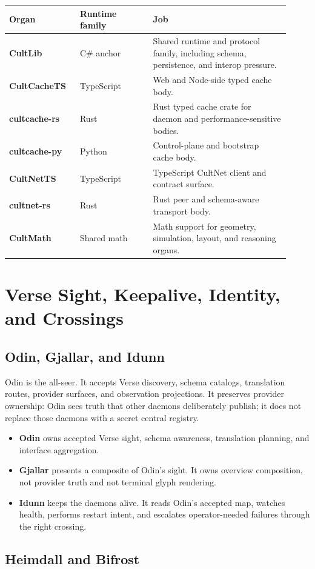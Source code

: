 \documentclass[11pt,oneside]{article}
\newcommand{\Organ}[3]{\textbf{#1} & #2 & #3\\}
\newcommand{\Term}[1]{\textbf{\color{cultgold}#1}}
\begin{document}
\begin{longtable}{>{\bfseries}p{0.23\linewidth}p{0.24\linewidth}p{0.45\linewidth}}
\toprule
Organ & Runtime family & Job\\
\midrule
\Organ{CultLib}{C\# anchor}{Shared runtime and protocol family, including schema, persistence, and interop pressure.}
\Organ{CultCacheTS}{TypeScript}{Web and Node-side typed cache body.}
\Organ{cultcache-rs}{Rust}{Rust typed cache crate for daemon and performance-sensitive bodies.}
\Organ{cultcache-py}{Python}{Control-plane and bootstrap cache body.}
\Organ{CultNetTS}{TypeScript}{TypeScript CultNet client and contract surface.}
\Organ{cultnet-rs}{Rust}{Rust peer and schema-aware transport body.}
\Organ{CultMath}{Shared math}{Math support for geometry, simulation, layout, and reasoning organs.}
\bottomrule
\end{longtable}

\section{Verse Sight, Keepalive, Identity, and Crossings}

\subsection{Odin, Gjallar, and Idunn}

Odin is the all-seer. It accepts Verse discovery, schema catalogs, translation
routes, provider surfaces, and observation projections. It preserves provider
ownership: Odin sees truth that other daemons deliberately publish; it does not
replace those daemons with a secret central registry.

\begin{itemize}
  \item \Term{Odin} owns accepted Verse sight, schema awareness, translation planning, and interface aggregation.
  \item \Term{Gjallar} presents a composite of Odin's sight. It owns overview composition, not provider truth and not terminal glyph rendering.
  \item \Term{Idunn} keeps the daemons alive. It reads Odin's accepted map, watches health, performs restart intent, and escalates operator-needed failures through the right crossing.
\end{itemize}

\subsection{Heimdall and Bifrost}
\end{document}
